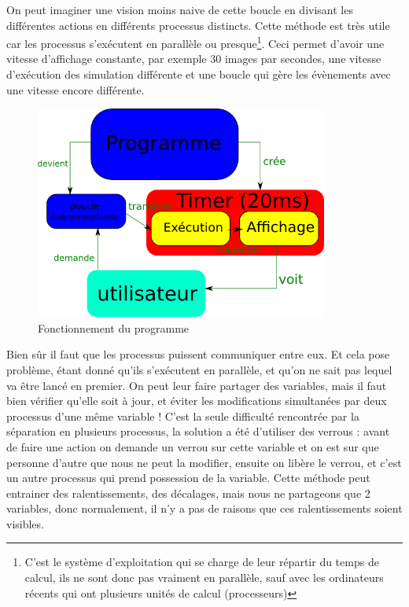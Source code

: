 On peut imaginer une vision moins naive de cette boucle en divisant les différentes actions en différents processus distincts. Cette méthode est très utile car les processus s'exécutent en parallèle ou presque\footnote{C'est le système d'exploitation qui se charge de leur répartir du temps de calcul, ils ne sont donc pas vraiment en parallèle, sauf avec les ordinateurs récents qui ont plusieurs unités de calcul (processeurs)}. Ceci permet d'avoir une 
vitesse d'affichage constante, par exemple 30 images par secondes, une vitesse d'exécution des simulation différente et une boucle qui gère les évènements avec une vitesse encore différente.

\begin{figure}[H]
	\centering
	\includegraphics[width=26em]{Images/fonctionnement_programme.png}
	\caption{Fonctionnement du programme}
\end{figure}

Bien sûr il faut que les processus puissent communiquer entre eux. Et cela pose problème, étant donné qu'ils s'exécutent en parallèle, et qu'on ne sait pas lequel va être lancé en premier. On peut leur faire partager des variables, mais il faut bien vérifier qu'elle soit à jour, et éviter les modifications simultanées par deux processus d'une même variable ! C'est la seule difficulté rencontrée par la séparation en plusieurs processus, la solution a été d'utiliser des verrous : avant de faire une action on demande un verrou sur cette variable et on est sur que personne d'autre que nous ne peut la modifier, ensuite on libère le verrou, et c'est un autre processus qui prend possession de la variable. Cette méthode peut entrainer des ralentissements, des décalages, mais nous ne partageons que 2 variables, donc normalement, il n'y a pas de raisons que ces ralentissements soient visibles.

